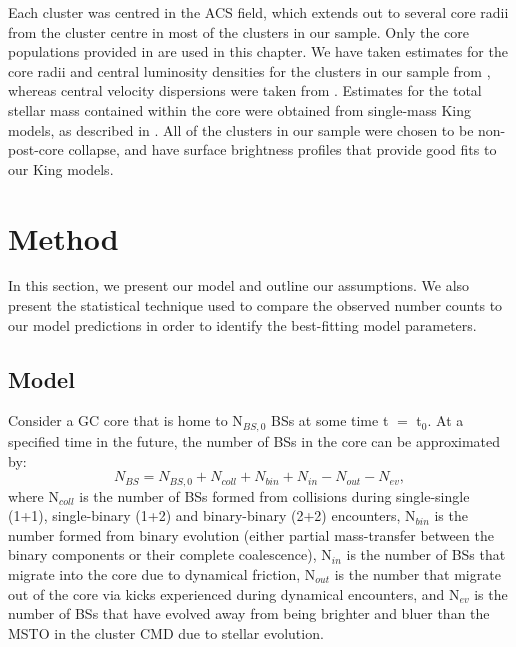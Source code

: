 Each cluster was centred in the ACS field, which 
extends out to several core radii from the cluster
centre in most of the clusters in our sample.  Only the core
populations provided in \citet{leigh11a} are used in this chapter.
We have taken estimates for the core radii and central luminosity
densities for the clusters in our sample from
\citet{harris96}, whereas central velocity 
dispersions were taken from \citet{webbink85}.  Estimates for the
total stellar mass contained within the core were obtained from
single-mass King models, as described in \citet{leigh11a}.  All of the
clusters in our sample were chosen to be non-post-core collapse, and
have surface brightness profiles that provide good fits to our King
models. 

\section{Method} \label{method5}

In this section, we present our model and outline our
assumptions.  We also present the statistical technique used to
compare the 
observed number counts to our model predictions in order to identify
the best-fitting model parameters. 

\subsection{Model} \label{model5}

Consider a GC core that is home to N$_{BS,0}$ BSs at some time t $=$
t$_0$.  At a specified time in the future, the number of BSs in the
core can be approximated by: 
\begin{equation}
\label{eqn:number-bss}
N_{BS} = N_{BS,0} + N_{coll} + N_{bin} + N_{in} - N_{out} - N_{ev},
\end{equation}
where N$_{coll}$ is the number of BSs formed from collisions during
single-single (1+1), single-binary (1+2) and binary-binary (2+2)
encounters, N$_{bin}$ is the number formed from 
binary evolution (either partial mass-transfer between the binary
components or their complete coalescence), N$_{in}$ is the number 
of BSs that migrate into the core due to dynamical friction, N$_{out}$
is the number that migrate out of the core via kicks experienced during
dynamical encounters, and N$_{ev}$ is the number of BSs that have
evolved away from being brighter and bluer than the MSTO in the
cluster CMD due to stellar evolution.  


